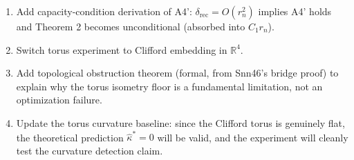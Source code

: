 \documentclass{article}
\begin{document}
\begin{enumerate}
  \item Add capacity-condition derivation of A4': $\delta_{\mathrm{rec}} = O(r_n^2)$
    implies A4' holds and Theorem 2 becomes unconditional (absorbed into $C_1 r_n$).
  \item Switch torus experiment to Clifford embedding in $\mathbb{R}^4$.
  \item Add topological obstruction theorem (formal, from Snn46's bridge proof)
    to explain why the torus isometry floor is a fundamental limitation, not
    an optimization failure.
  \item Update the torus curvature baseline: since the Clifford torus is
    genuinely flat, the theoretical prediction $\hat{\kappa}^* = 0$ will be
    valid, and the experiment will cleanly test the curvature detection claim.
\end{enumerate}
\end{document}
